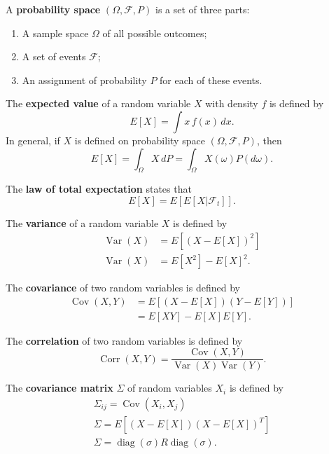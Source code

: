 \documentclass[10pt]{article}
\DeclareMathOperator{\Corr}{Corr}
\DeclareMathOperator{\Var}{Var}
\DeclareMathOperator{\Cov}{Cov}
\DeclareMathOperator{\diag}{diag}
\begin{document}
\begin{outline}
\1 A \textbf{probability space} $(\Omega, \mathscr{F}, P)$ is a set of three parts:
\begin{enumerate}
\item A sample space $\Omega$ of all possible outcomes;
\item A set of events $\mathscr{F}$;
\item An assignment of probability $P$ for each of these events.
\end{enumerate}

\1 The \textbf{expected value} of a random variable $X$ with density $f$ is defined by
\begin{equation*}
  E[X] = \int x\,f(x)\,dx.
\end{equation*}
In general, if $X$ is defined on probability space $(\Omega,\mathscr{F},P)$, then 
\begin{equation*}
  E[X] = \int_\Omega X\,dP = \int_\Omega X(\omega)P(d\omega).
\end{equation*}

\1 The \textbf{law of total expectation} states that
\begin{equation*}
  E[X] = E[E[X|\mathscr{F}_t]].
\end{equation*}

\1 The \textbf{variance} of a random variable $X$ is defined by
\begin{align*}
  \Var(X) &= E[(X-E[X])^2]\\
  \Var(X) &= E[X^2] - E[X]^2.
\end{align*}

\1 The \textbf{covariance} of two random variables is defined by
\begin{align*}
  \Cov(X,Y) &= E[(X-E[X])(Y-E[Y])]\\
            &= E[XY] - E[X]E[Y].
\end{align*}

\1 The \textbf{correlation} of two random variables is defined by
\begin{equation*}
  \Corr(X,Y) = \frac{\Cov(X,Y)}{\Var(X)\Var(Y)}.
\end{equation*}

\1 The \textbf{covariance matrix} $\Sigma$ of random variables $X_i$ is defined by
\begin{gather*}
  \Sigma_{ij} = \Cov(X_i,X_j)\\
  \Sigma = E[(X-E[X])(X-E[X])^T]\\
  \Sigma = \diag(\sigma)R\diag(\sigma).
\end{gather*}


\end{outline}
\end{document}
